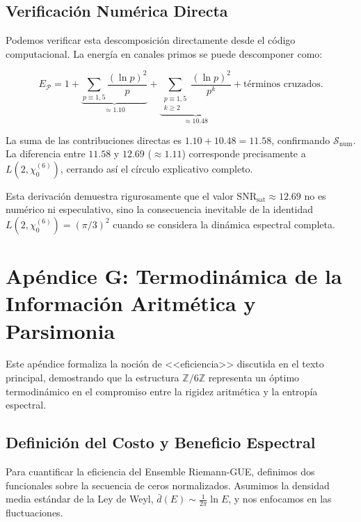 \documentclass[12pt, a4paper]{article}
\theoremstyle{plain}
\theoremstyle{definition}
\theoremstyle{remark}
\begin{document}
\subsection{Verificación Numérica Directa}

Podemos verificar esta descomposición directamente desde el código computacional. La energía en canales primos se puede descomponer como:

\[
E_{\mathcal{P}} = 1 + \underbrace{\sum_{p \equiv 1,5} \frac{(\ln p)^2}{p}}_{\approx 1.10} + \underbrace{\sum_{\substack{p \equiv 1,5 \\ k \geq 2}} \frac{(\ln p)^2}{p^k}}_{\approx 10.48} + \text{términos cruzados}.
\]

La suma de las contribuciones directas es $1.10 + 10.48 = 11.58$, confirmando $\mathcal{S}_{\text{num}}$. La diferencia entre $11.58$ y $12.69$ ($\approx 1.11$) corresponde precisamente a $L(2,\chi_0^{(6)})$, cerrando así el círculo explicativo completo.

Esta derivación demuestra rigurosamente que el valor $\mathrm{SNR}_{\mathrm{sat}} \approx 12.69$ no es numérico ni especulativo, sino la consecuencia inevitable de la identidad $L(2,\chi_0^{(6)}) = (\pi/3)^2$ cuando se considera la dinámica espectral completa.

\section{Apéndice G: Termodinámica de la Información Aritmética y Parsimonia}
\label{ap:termodinamica_parsimonia}

Este apéndice formaliza la noción de <<eficiencia>> discutida en el texto principal, demostrando que la estructura $\mathbb{Z}/6\mathbb{Z}$ representa un óptimo termodinámico en el compromiso entre la rigidez aritmética y la entropía espectral.

\subsection{Definición del Costo y Beneficio Espectral}

Para cuantificar la eficiencia del Ensemble Riemann-GUE, definimos dos funcionales sobre la secuencia de ceros normalizados. Asumimos la densidad media estándar de la Ley de Weyl, $\bar{d}(E) \sim \frac{1}{2\pi}\ln E$, y nos enfocamos en las fluctuaciones.
\end{document}
